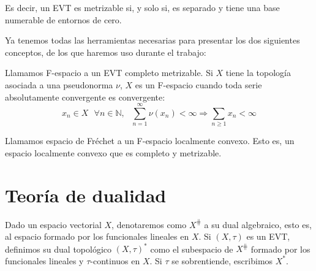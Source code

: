 Es decir, un EVT es metrizable si, y solo si, es separado y tiene una base numerable de entornos de cero. 

Ya tenemos todas las herramientas necesarias para presentar los dos siguientes conceptos, de los que haremos uso durante el trabajo: 

\begin{definicion}
Llamamos F-espacio a un EVT completo metrizable. Si $X$ tiene la topología asociada a una pseudonorma $\nu$, $X$ es un F-espacio cuando toda serie absolutamente convergente es convergente: 
\begin{equation}
x_{n}\in X\text{ } \forall n \in \mathds{N}, \text{ } \sum_{n=1}^{\infty} \nu (x_{n}) < \infty \Rightarrow \sum_{n\geq 1} x_{n} < \infty
\end{equation}
\end{definicion}


\begin{definicion}
Llamamos espacio de Fréchet a un F-espacio localmente convexo. Esto es, un espacio localmente convexo que es completo y metrizable.
\end{definicion}

\section{Teoría de dualidad}
\begin{definicion}
Dado un espacio vectorial $X$, denotaremos como $X^{\hash}$ a su dual algebraico, esto es, al espacio formado por los funcionales lineales en $X$. Si $(X,\tau)$ es un EVT, definimos su dual topológico $(X,\tau)^{*}$ como el subespacio de $X^{\hash}$ formado por los funcionales lineales y $\tau$-continuos en $X$. Si $\tau$ se sobrentiende, escribimos $X^{*}$.
\end{definicion}


